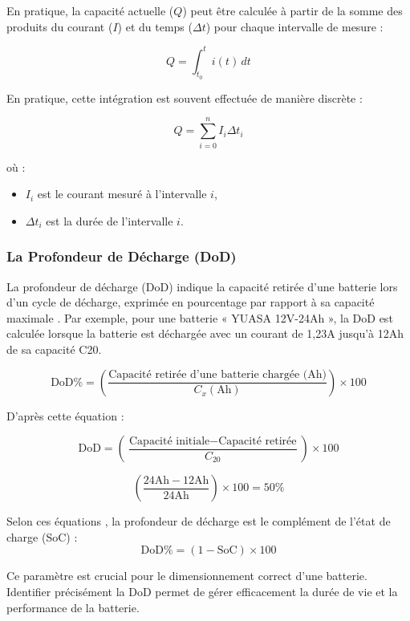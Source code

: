 En pratique, la capacité actuelle (\(Q\)) peut être calculée à partir de la somme des produits du courant (\(I\)) et du temps (\(\Delta t\)) pour chaque intervalle de mesure :

\begin{equation}
Q = \int_{t_0}^{t} i(t) \, dt
\end{equation}

En pratique, cette intégration est souvent effectuée de manière discrète :

\begin{equation}
Q = \sum_{i=0}^{n} I_i \Delta t_i
\end{equation}

où :

\begin{itemize}
	\item \(I_i\) est le courant mesuré à l'intervalle \(i\),
	\item \(\Delta t_i\) est la durée de l'intervalle \(i\).
\end{itemize}

\subsubsection{La Profondeur de Décharge (DoD)}
La profondeur de décharge (DoD) indique la capacité retirée d'une batterie lors d'un cycle de décharge, exprimée en pourcentage par rapport à sa capacité maximale \cite{a2}. Par exemple, pour une batterie « YUASA 12V-24Ah », la DoD est calculée lorsque la batterie est déchargée avec un courant de 1,23A jusqu'à 12Ah de sa capacité C20.

\begin{equation}
\text{DoD} \% = \left( \frac{\text{Capacité retirée d'une batterie chargée (Ah)}}{C_x (\text{Ah})} \right) \times 100
\end{equation}

D'après cette équation  :

\[
\text{DoD} = \left( \frac{\text{Capacité initiale} - \text{Capacité retirée}}{C_{20}} \right) \times 100
\]

\[
\left( \frac{24\text{Ah} - 12\text{Ah}}{24\text{Ah}} \right) \times 100 = 50\%
\]

Selon ces équations , la profondeur de décharge est le complément de l'état de charge (SoC) :
\begin{equation}
\text{DoD} \% = (1 - \text{SoC}) \times 100
\end{equation}

Ce paramètre est crucial pour le dimensionnement correct d'une batterie. Identifier précisément la DoD permet de gérer efficacement la durée de vie et la performance de la batterie.

